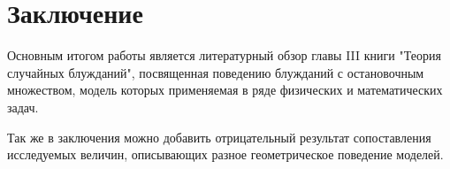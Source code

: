 \section{Заключение}

Основным итогом работы является литературный обзор главы III книги "Теория случайных блужданий", посвященная поведению блужданий с остановочным множеством, модель которых применяемая в ряде физических и математических задач.

Так же в заключения можно добавить отрицательный результат сопоставления исследуемых величин, описывающих разное геометрическое поведение моделей.

